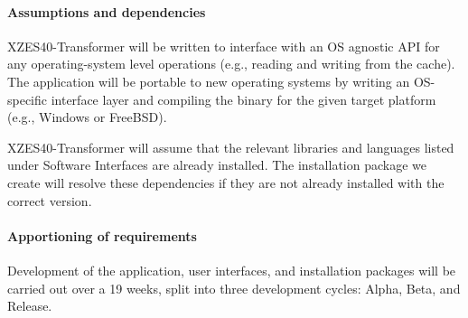 \paragraph{Assumptions and dependencies}

XZES40-Transformer will be written to interface with an OS agnostic API for any operating-system level operations (e.g., reading and writing from the cache).
The application will be portable to new operating systems by writing an OS-specific interface layer and compiling the binary for the given target platform (e.g., Windows or FreeBSD).

XZES40-Transformer will assume that the relevant libraries and languages listed under Software Interfaces are already installed.
The installation package we create will resolve these dependencies if they are not already installed with the correct version.


\paragraph{Apportioning of requirements}

Development of the application, user interfaces, and installation packages will be carried out over a 19 weeks, split into three development cycles: Alpha, Beta, and Release.

